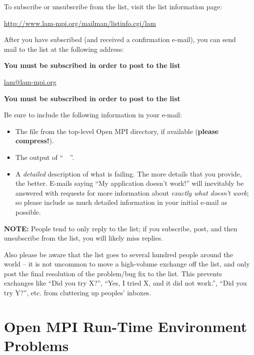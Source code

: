 To subscribe or unsubscribe from the list, visit the list information
page:

\vspace{11pt}
\centerline{\url{http://www.lam-mpi.org/mailman/listinfo.cgi/lam}}
\vspace{11pt}
  
After you have subscribed (and received a confirmation e-mail), you
can send mail to the list at the following address:
  
\vspace{11pt}
\centerline{{\bf You must be subscribed in order to post to the list}}
\centerline{\url{lam@lam-mpi.org}}
\centerline{{\bf You must be subscribed in order to post to the list}}
\vspace{11pt}

Be sure to include the following information in your e-mail:

\begin{itemize}
\item The  file from the top-level Open MPI directory, if
  available ({\bf please compress!}).
  
\item The output of ``\ \ ''.

\item A {\em detailed} description of what is failing.  The more
  details that you provide, the better.  E-mails saying ``My
  application doesn't work!'' will inevitably be answered with
  requests for more information about {\em exactly what doesn't work};
  so please include as much detailed information in your initial
  e-mail as possible.
\end{itemize}
  
{\bf NOTE:} People tend to only reply to the list; if you subscribe,
post, and then unsubscribe from the list, you will likely miss
replies.
  
Also please be aware that the list goes to several hundred people
around the world -- it is not uncommon to move a high-volume exchange
off the list, and only post the final resolution of the problem/bug
fix to the list.  This prevents exchanges like ``Did you try X?'',
``Yes, I tried X, and it did not work.'', ``Did you try Y?'', etc.
from cluttering up peoples' inboxes.


\section{Open MPI Run-Time Environment Problems}

